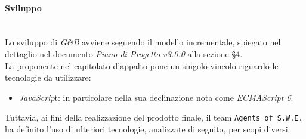 \paragraph{Sviluppo} \-\\
\label{Progettazione_Sviluppo}
Lo sviluppo di \textit{G\&B} avviene seguendo il modello incrementale, spiegato nel dettaglio nel documento \textit{Piano di Progetto v3.0.0} alla sezione §4.\\
La proponente nel capitolato d'appalto pone un singolo vincolo riguardo le tecnologie da utilizzare:
\begin{itemize}
	\item \textit{JavaScrip}t: in particolare nella sua declinazione nota come \textit{ECMAScript 6}\glossario.
\end{itemize}
Tuttavia, ai fini della realizzazione del prodotto finale, il team \texttt{Agents of S.W.E.} ha definito l'uso di ulteriori tecnologie, analizzate di seguito, per scopi diversi:
